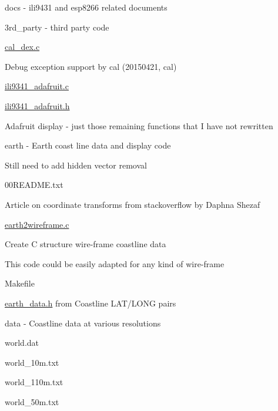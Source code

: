 docs -\/ ili9431 and esp8266 related documents


\begin{DoxyItemize}
\item 3rd\+\_\+party -\/ third party code
\begin{DoxyItemize}
\item \hyperlink{cal__dex_8c}{cal\+\_\+dex.\+c}
\begin{DoxyItemize}
\item Debug exception support by cal (20150421, cal)
\end{DoxyItemize}
\item \hyperlink{ili9341__adafruit_8c}{ili9341\+\_\+adafruit.\+c}
\item \hyperlink{ili9341__adafruit_8h}{ili9341\+\_\+adafruit.\+h}
\begin{DoxyItemize}
\item Adafruit display -\/ just those remaining functions that I have not rewritten
\end{DoxyItemize}
\end{DoxyItemize}
\end{DoxyItemize}

earth -\/ Earth coast line data and display code
\begin{DoxyItemize}
\item Still need to add hidden vector removal
\begin{DoxyItemize}
\item 00\+R\+E\+A\+D\+M\+E.\+txt
\begin{DoxyItemize}
\item Article on coordinate transforms from stackoverflow by Daphna Shezaf
\end{DoxyItemize}
\item \hyperlink{earth2wireframe_8c}{earth2wireframe.\+c}
\begin{DoxyItemize}
\item Create C structure wire-\/frame coastline data
\item This code could be easily adapted for any kind of wire-\/frame
\end{DoxyItemize}
\item Makefile
\begin{DoxyItemize}
\item \hyperlink{earth__data_8h}{earth\+\_\+data.\+h} from Coastline L\+A\+T/\+L\+O\+NG pairs
\end{DoxyItemize}
\item data -\/ Coastline data at various resolutions
\begin{DoxyItemize}
\item world.\+dat
\item world\+\_\+10m.\+txt
\item world\+\_\+110m.\+txt
\item world\+\_\+50m.\+txt
\end{DoxyItemize}
\end{DoxyItemize}
\end{DoxyItemize}

